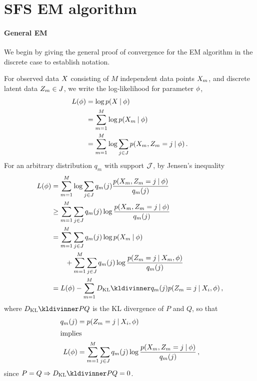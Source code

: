 \section{SFS EM algorithm}\label{text:sfsem}

\paragraph{General EM}

We begin by giving the general proof of convergence for the EM algorithm \cite{Dempster1977} in the discrete case to establish notation.

For observed data $\data$ consisting of $M$ independent data points $\data[m]$, and discrete latent data $\ct[m] \in J$, we write the log-likelihood for parameter $\phi$,
%
\begin{align}
    L(\sfs) 
    &= \log \prob(\data \given \sfs) \nonumber \\
    &= \sum_{m = 1}^M \log \prob(\data[m] \given \sfs) \nonumber \\
    &= \sum_{m = 1}^M \log \sum_{j \in J} \prob(\data[m], \ct[m] = j \given \sfs) \, .
\end{align}
%
For an arbitrary distribution $q_m$ with support $\mathcal{J}$, by Jensen's inequality
%
\begin{align}
    L(\sfs) 
    &= \sum_{m = 1}^M \log \sum_{j \in J} q_m(j) \frac{\prob(\data[m], \ct[m] = j \given \sfs)}{q_m(j)} \nonumber \\
    &\geq \sum_{m = 1}^M \sum_{j \in J} q_m(j) \log \frac{\prob(\data[m], \ct[m] = j \given \sfs)}{q_m(j)} \nonumber \\
    &= \sum_{m = 1}^M \sum_{j \in J} q_m(j) \log \prob(\data[m] \given \sfs)  \nonumber \\
    &\qquad + \sum_{m = 1}^M \sum_{j \in J} q_m(j) \log \frac{\prob(\ct[m] = j \given \data[m], \sfs)}{q_m(j)} \nonumber \\
    &= L(\sfs) - \sum_{m = 1}^M \kldiv{q_m(j)}{\prob(\ct[m] = j \given \data_i, \sfs)} \, ,
\end{align}
%
where $\kldiv{P}{Q}$ is the KL divergence of $P$ and $Q$, so that
%
\begin{align}
    q_m(j) &= \prob(\ct[m] = j \given \data_i, \sfs) \\
    \intertext{implies}
    L(\sfs) &= \sum_{m = 1}^M \sum_{j \in J} q_m(j) \log \frac{\prob(\data[m], \ct[m] = j \given \sfs)}{q_m(j)}  \, ,
\end{align}
%
since $P = Q \Rightarrow \kldiv{P}{Q} = 0$.
